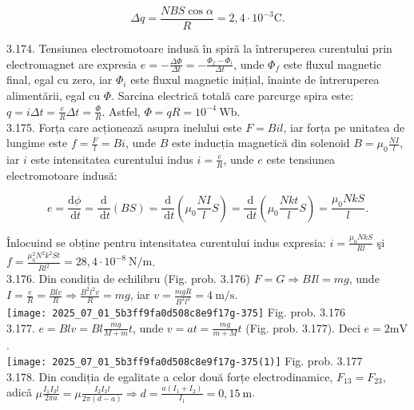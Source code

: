 $$
\Delta q=\frac{N B S \cos \alpha}{R}=2,4 \cdot 10^{-3} \mathrm{C} .
$$

3.174. Tensiunea electromotoare indusă în spiră la întreruperea curentului prin electromagnet are expresia $e=-\frac{\Delta \Phi}{\Delta t}=-\frac{\Phi_{f}-\Phi_{i}}{\Delta t}$, unde $\Phi_{f}$ este fluxul magnetic final, egal cu zero, iar $\Phi_{i}$ este fluxul magnetic inițial, înainte de întreruperea alimentării, egal cu $\Phi$. Sarcina electrică totală care parcurge spira este: $q=i \Delta t=\frac{e}{R} \Delta t=\frac{\Phi}{R}$. Astfel, $\Phi=q R=10^{-4} \mathrm{~Wb}$.\\
3.175. Forța care acționează asupra inelului este $F=B i l$, iar forța pe unitatea de lungime este $f=\frac{F}{l}=B i$, unde $B$ este inducția magnetică din solenoid $B=\mu_{0} \frac{N I}{l}$, iar $i$ este intensitatea curentului indus $i=\frac{e}{R}$, unde $e$ este tensiunea electromotoare indusă:

$$
e=\frac{\mathrm{d} \phi}{\mathrm{~d} t}=\frac{\mathrm{d}}{\mathrm{~d} t}(B S)=\frac{\mathrm{d}}{\mathrm{~d} t}\left(\mu_{0} \frac{N I}{l} S\right)=\frac{\mathrm{d}}{\mathrm{~d} t}\left(\mu_{0} \frac{N k t}{l} S\right)=\frac{\mu_{0} N k S}{l} .
$$

Înlocuind se obține pentru intensitatea curentului indus expresia: $i=\frac{\mu_{0} N k S}{R l}$ şi $f=\frac{\mu_{0}^{2} N^{2} k^{2} S t}{R l^{2}}=28,4 \cdot 10^{-8} \mathrm{~N} / \mathrm{m}$.\\

3.176. Din condiția de echilibru (Fig. prob. 3.176) $F=G \Rightarrow B I l=m g$, unde $I=\frac{e}{R}=\frac{B l v}{R} \Rightarrow \frac{B^{2} l^{2} v}{R}=m g$, iar $v=\frac{m g R}{B^{2} l^{2}}=4 \mathrm{~m} / \mathrm{s}$.\\ \texttt{[image: 2025\_07\_01\_5b3ff9fa0d508c8e9f17g-375]} Fig. prob. 3.176\\

3.177. $e=B l v=B l \frac{m g}{M+m} t$, unde $v=a t=\frac{m g}{m+M} t$ (Fig. prob. 3.177). Deci $e=2 \mathrm{mV}$.\\ \texttt{[image: 2025\_07\_01\_5b3ff9fa0d508c8e9f17g-375(1)]} Fig. prob. 3.177\\

3.178. Din condiția de egalitate a celor două forțe electrodinamice, $F_{13}=F_{23}$, adicã $\mu \frac{I_{1} I_{3} l}{2 \pi a}=\mu \frac{I_{2} I_{3} l}{2 \pi(d-a)} \Rightarrow d=\frac{a\left(I_{1}+I_{2}\right)}{I_{1}}=0,15 \mathrm{~m}$.\\

